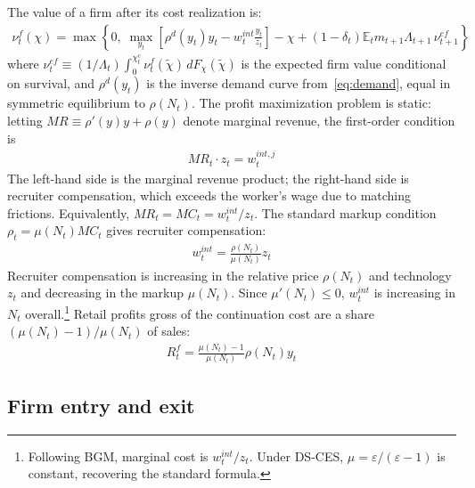 \documentclass[authoryear, review, 12pt]{elsarticle}
\begin{document}
	The value of a firm after its cost realization is:
	\begin{align}\label{eq:firm_bellman}
		\nu_t^f(\chi) = \max\left\{0,\; 
		\max_{y_t}\left[\rho^d(y_t)y_t - 
		w_t^{int}\frac{y_t}{z_t}\right]
		-\chi + (1-\delta_t)\mathbb{E}_t m_{t+1}\Lambda_{t+1}
		\,\nu_{t+1}^{ef}\right\}
	\end{align}
	where $\nu_t^{ef}\equiv(1/\Lambda_t)\int_0^{\chi_t^c}
	\nu_t^f(\tilde{\chi})\,dF_\chi(\tilde{\chi})$ is the expected 
	firm value conditional on survival, and $\rho^d(y_t)$ is the 
	inverse demand curve from~\eqref{eq:demand}, equal in symmetric 
	equilibrium to $\rho(N_t)$. The profit maximization problem 
	is static: letting $MR\equiv\rho'(y)y+\rho(y)$ denote marginal 
	revenue, the first-order condition is
	\begin{align}\label{eq:retailer_optimality}
		MR_t\cdot z_t = w_t^{int,j}
	\end{align}
	The left-hand side is the marginal revenue product; the 
	right-hand side is recruiter compensation, which exceeds the 
	worker's wage due to matching frictions. Equivalently, 
	$MR_t = MC_t = w_t^{int}/z_t$. The standard markup condition 
	$\rho_t = \mu(N_t)MC_t$ gives recruiter compensation:
	\begin{align}\label{eq:recruiter_compensation}
		w_t^{int} = \frac{\rho(N_t)}{\mu(N_t)}z_t
	\end{align}
	Recruiter compensation is increasing in the relative price 
	$\rho(N_t)$ and technology $z_t$ and decreasing in the markup 
	$\mu(N_t)$. Since $\mu'(N_t)\leq 0$, $w_t^{int}$ is 
	increasing in $N_t$ overall.\footnote{Following BGM, marginal 
		cost is $w_t^{int}/z_t$. Under DS-CES, $\mu=\varepsilon/
		(\varepsilon-1)$ is constant, recovering the standard formula.} 
	Retail profits gross of the continuation cost are a share 
	$(\mu(N_t)-1)/\mu(N_t)$ of sales:
	\begin{align}\label{eq:retail_profits}
		R_t^f = \frac{\mu(N_t)-1}{\mu(N_t)}\rho(N_t)y_t
	\end{align}
	
	\subsection{Firm entry and exit}\label{sec:entry_exit}
	
\end{document}
